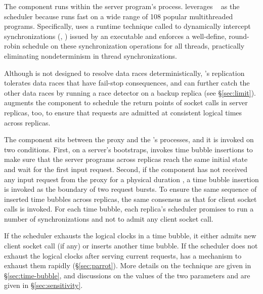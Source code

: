 The \dmt component runs within the server program's process. \xxx leverages 
\parrot~\cite{parrot:sosp13} as the \dmt scheduler because \parrot 
runs fast on a wide range of 108 popular multithreaded programs. Specifically, 
\parrot uses a runtime technique called \ldpreload to dynamically intercept 
\pthread synchronizations (\eg, \mutexlock) issued by an executable and 
enforces a well-define, round-robin schedule on these synchronization 
operations for all threads, practically eliminating nondeterminism in thread 
synchronizations.

Although \parrot is not designed to resolve data races
deterministically, \xxx's replication tolerates data races that have
fail-stop consequences, and can further catch the
other data races by running a race detector on a backup replica (see
\S\ref{sec:limit}).  \xxx augments the \dmt component to schedule the
return points of socket calls in server replicas, too, to ensure that
requests are admitted at consistent logical times across replicas.

The \timealgo component sits between the proxy and the \dmt's processes, and it 
is invoked on two conditions. First, on a server's bootstraps, \xxx invokes 
time bubble insertions to make sure that the server programs across replicas 
reach the same initial state and wait for the first input request. Second, if 
the \dmt component has not received any input request from the proxy for a 
physical duration \ntimeout, a time bubble insertion is invoked as the boundary 
of two request bursts. To ensure the same sequence of inserted time bubbles 
across replicas, the same \paxos consensus as that for client socket calls is 
invoked. For each time bubble, each replica's \dmt scheduler promises to run a 
number of \nclock synchronizations and not to admit any 
client socket call.

If the \dmt scheduler exhausts the logical clocks in a time bubble, it either 
admits new client socket call (if any) or inserts another time bubble. If the 
scheduler does not exhaust the logical clocks after serving current requests, 
\parrot has a mechanism to exhaust them rapidly (\S\ref{sec:parrot}). More 
details on the \timealgo technique are given in \S\ref{sec:time-bubble}, and 
discussions on the values of the two parameters \ntimeout and \nclock are given 
in \S\ref{sec:sensitivity}.




